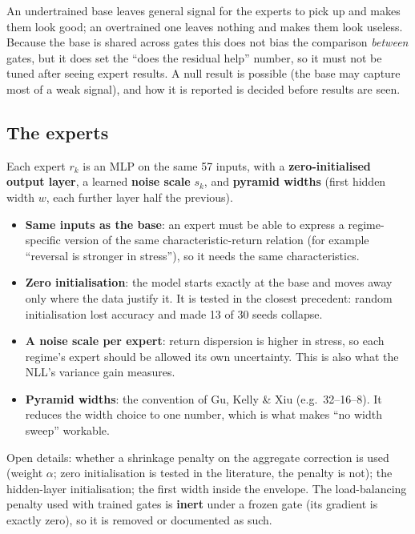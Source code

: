 \begin{whybox}
An undertrained base leaves general signal for the experts to pick up and makes them look good; an
overtrained one leaves nothing and makes them look useless. Because the base is shared across gates this
does not bias the comparison \emph{between} gates, but it does set the ``does the residual help'' number,
so it must not be tuned after seeing expert results. A null result is possible (the base may capture
most of a weak signal), and how it is reported is decided before results are seen.
\end{whybox}

\subsection{The experts}

Each expert $r_k$ is an MLP on the same 57 inputs, with a \textbf{zero-initialised output layer}, a learned
\textbf{noise scale} $s_k$, and \textbf{pyramid widths} (first hidden width $w$, each further layer half the
previous).

\begin{whybox}
\begin{itemize}
\item \textbf{Same inputs as the base}: an expert must be able to express a regime-specific version of the
  same characteristic-return relation (for example ``reversal is stronger in stress''), so it needs the
  same characteristics.
\item \textbf{Zero initialisation}: the model starts exactly at the base and moves away only where the data
  justify it. It is tested in the closest precedent: random initialisation lost accuracy and made 13 of
  30 seeds collapse.
\item \textbf{A noise scale per expert}: return dispersion is higher in stress, so each regime's expert should be
  allowed its own uncertainty. This is also what the NLL's variance gain measures.
\item \textbf{Pyramid widths}: the convention of Gu, Kelly \& Xiu (e.g.\ 32--16--8). It reduces the width
  choice to one number, which is what makes ``no width sweep'' workable.
\end{itemize}
\end{whybox}

Open details:  whether a shrinkage penalty on the aggregate correction is used (weight
$\alpha$; zero initialisation is tested in the literature, the penalty is not);  the
hidden-layer initialisation;  the first width inside the envelope. The load-balancing penalty used
with trained gates is \textbf{inert} under a frozen gate (its gradient is exactly zero), so it is removed or
documented as such.

